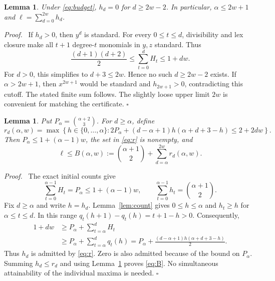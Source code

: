 \documentclass[11pt,a4paper]{article}
\newtheorem{lemma}[theorem]{Lemma}
\newenvironment{proof}[1][Proof]{\par\noindent\textit{#1.}\ \ignorespaces}{\unskip\nobreak\hfill\ensuremath{\square}\par}
\begin{document}
\begin{lemma}\label{lem:cutoff}
Under \eqref{eq:budget}, $h_d=0$ for $d\ge2w-2$. In particular, $\alpha\le2w+1$ and $\ell=\sum_{d=0}^{2w}h_d$.
\end{lemma}
\begin{proof}
If $h_d>0$, then $y^d$ is standard. For every $0\le t\le d$, divisibility and lex closure make all $t+1$ degree-$t$ monomials in $y,z$ standard. Thus
\[
 \frac{(d+1)(d+2)}2\le\sum_{t=0}^dH_t\le1+dw.
\]
For $d>0$, this simplifies to $d+3\le2w$. Hence no such $d\ge2w-2$ exists. If $\alpha>2w+1$, then $x^{2w+1}$ would be standard and $h_{2w+1}>0$, contradicting this cutoff. The stated finite sum follows. The slightly loose upper limit $2w$ is convenient for matching the certificate.
\end{proof}

\begin{lemma}\label{lem:envelope}
Put $P_\alpha=\binom{\alpha+2}{3}$. For $d\ge\alpha$, define
\begin{equation}\label{eq:r}
 r_d(\alpha,w)=\max\left\{h\in\{0,\ldots,\alpha\}:
 2P_\alpha+(d-\alpha+1)h(\alpha+d+3-h)\le2+2dw\right\}.
\end{equation}
Then $P_\alpha\le1+(\alpha-1)w$, the set in \eqref{eq:r} is nonempty, and
\begin{equation}\label{eq:B}
 \ell\le B(\alpha,w):=\binom{\alpha+1}{2}
                  +\sum_{d=\alpha}^{2w}r_d(\alpha,w).
\end{equation}
\end{lemma}
\begin{proof}
The exact initial counts give
\[
 \sum_{t=0}^{\alpha-1}H_t=P_\alpha\le1+(\alpha-1)w,
 \qquad \sum_{t=0}^{\alpha-1}h_t=\binom{\alpha+1}{2}.
\]
Fix $d\ge\alpha$ and write $h=h_d$. Lemma~\ref{lem:count} gives $0\le h\le\alpha$ and $h_t\ge h$ for $\alpha\le t\le d$. In this range $q_t(h+1)-q_t(h)=t+1-h>0$. Consequently,
\begin{align*}
 1+dw&\ge P_\alpha+\sum_{t=\alpha}^{d}H_t\\
 &\ge P_\alpha+\sum_{t=\alpha}^{d}q_t(h)
 =P_\alpha+\frac{(d-\alpha+1)h(\alpha+d+3-h)}2.
\end{align*}
Thus $h_d$ is admitted by \eqref{eq:r}. Zero is also admitted because of the bound on $P_\alpha$. Summing $h_d\le r_d$ and using Lemma~\ref{lem:cutoff} proves \eqref{eq:B}. No simultaneous attainability of the individual maxima is needed.
\end{proof}
\end{document}

